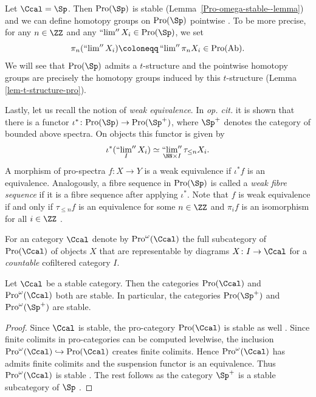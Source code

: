 \documentclass[colorinlistoftodos,article,11pt,reqno]{article}
\newcommand{\Pro}{\textup{Pro}}
\renewcommand{\to}[1][]{\overset{#1}{\rightarrow}}
\newcommand{\inj}[1][]{\overset{#1}{\hookrightarrow}}		%
\DeclareMathOperator*{\prolim}{``lim''}
\newcommand{\infcat}{category}
\begin{document}
Let $\Ccal = \Sp$. Then $\Pro(\Sp)$ is stable (Lemma~\ref{Pro-omega-stable--lemma}) and we can define homotopy groups on $\Pro(\Sp)$ pointwise \cite{kst-i}. To be more precise, for any $n\in \ZZ$ and any $\prolim X_i\in \Pro(\Sp)$, we set 
$$
    \pi_{n} (\prolim X_i )\coloneqq \prolim \pi_{n} X_{i} \in \Pro(\textup{Ab}).
$$
We will see that $\Pro(\Sp)$ admits a $t$-structure  and the pointwise homotopy groups are precisely the homotopy groups induced by this $t$-structure (Lemma \ref{lem-t-structure-pro}).

Lastly, let us recall the notion of \textit{weak equivalence}. In \textit{op.\!\! cit.} it is shown that there is a functor $\iota^{*}\colon \Pro(\Sp)\rightarrow \Pro(\Sp^{+})$, where $\Sp^{+}$ denotes the category of bounded above spectra. On objects this functor is given by 
$$
    \iota^{*}(\prolim_I X_i)\simeq \prolim_{\NN\times I} \tau_{\leq n}X_{i}.
$$
A morphism of pro-spectra $f\colon X\rightarrow Y$ is a weak equivalence if $\iota^{*}f$ is an equivalence. Analogously, a fibre sequence in $\Pro(\Sp)$ is called a \textit{weak fibre sequence} if it is a fibre sequence after applying $\iota^{*}$.
Note that $f$ is  weak equivalence if and only if $\tau_{\leq n}f$ is an equivalence for some $n\in\ZZ$ and $\pi_{i}f$ is an isomorphism for all $i\in \ZZ$ \cite[Lem. 2.8]{kst-i}.

\begin{defi} \label{Def:Pro-omega}
For an \infcat{} $\Ccal$ denote by $\Pro^\omega(\Ccal)$ the full subcategory of $\Pro(\Ccal)$ of objects $X$ that are representable by diagrams $X \colon I\to\Ccal$ for a \emph{countable} cofiltered category $I$.
\end{defi}

\begin{lemma} \label{Pro-omega-stable--lemma}
Let $\Ccal$ be a stable category. Then the categories $\Pro(\Ccal)$ and $\Pro^\omega(\Ccal)$ both are stable.
In particular, the categories $\Pro(\Sp^+)$ and $\Pro^\omega(\Sp^+)$ are stable.
\end{lemma}
\begin{proof}
Since $\Ccal$ is stable, the pro-category $\Pro(\Ccal)$ is stable as well \cite[2.5]{kst-i}. Since finite colimits in pro-categories can be computed levelwise, the inclusion $\Pro^\omega(\Ccal) \inj \Pro(\Ccal)$ creates finite colimits. Hence $\Pro^\omega(\Ccal)$ has admits finite colimits and the suspension functor is an equivalence. Thus $\Pro^\omega(\Ccal)$ is stable \cite[1.4.2.27]{HA}.
The rest follows as the category $\Sp^+$ is a stable subcategory of $\Sp$ \cite[p.~44]{HA}.
\end{proof}
\end{document}
